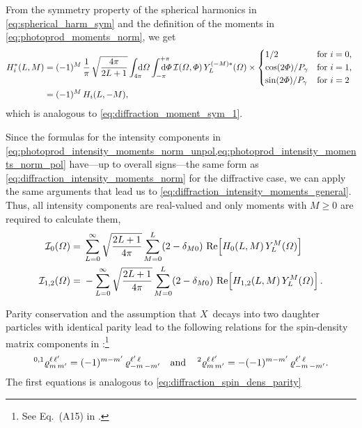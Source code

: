 From the symmetry property of the spherical harmonics in
\cref{eq:spherical_harm_sym} and the definition of the moments in
\cref{eq:photoprod_moments_norm}, we get
\begin{align}
  \label{eq:photoprod_moments_sym_1}
  H_i^*(L, M)
  ={}& (-1)^M\, \frac{1}{\pi}\, \sqrt{\frac{4 \pi}{2 L + 1}}
  \int_{4 \pi}\!\!\!\! \dif{\Omega} \int_{-\pi}^{+\pi}\hspace{-1.2em} \dif{\Phi}\,
  \intensity(\Omega, \Phi)\, Y_L^{(-M) *}(\Omega) \times \begin{cases*}
    1 / 2                   & for $i = 0$, \\
    \cos(2 \Phi) / P_\gamma & for $i = 1$, \\
    \sin(2 \Phi) / P_\gamma & for $i = 2$
  \end{cases*}
  \\
  ={}& (-1)^M\, H_i(L, {-M}),
\end{align}
which is analogous to \cref{eq:diffraction_moment_sym_1}.

Since the formulas for the intensity components in
\cref{eq:photoprod_intensity_moments_norm_unpol,eq:photoprod_intensity_moments_norm_pol}
have---up to overall signs---the same form as
\cref{eq:diffraction_intensity_moments_norm} for the diffractive case,
we can apply the same arguments that lead us to
\cref{eq:diffraction_intensity_moments_general}.  Thus, all intensity
components are real-valued and only moments with $M \geq 0$ are
required to calculate them, \ie
\begin{align}
  \label{eq:photoprod_intensity_moments_unpol_general}
  \intensity_0(\Omega)
  ={}& \sum_{L = 0}^\infty \sqrt{\frac{2 L + 1}{4 \pi}} \sum_{M = 0}^{L} (2 - \delta_{M 0})\, \Re{H_0(L, M)\, Y_L^M(\Omega)}
  \\
  \label{eq:photoprod_intensity_moments_pol_general}
  \intensity_{1, 2}(\Omega)
  ={}& -\sum_{L = 0}^\infty \sqrt{\frac{2 L + 1}{4 \pi}} \sum_{M = 0}^{L} (2 - \delta_{M 0})\, \Re{H_{1, 2}(L, M)\, Y_L^M(\Omega)}.
\end{align}

Parity conservation and the assumption that $X$~decays into two
daughter particles with identical parity lead to the following
relations for the spin-density matrix components in
:\footnote{See
Eq.~(A15) in .}
\begin{equation}
  \label{eq:photoprod_spin_dens_parity}
  \prescript{0, 1}{}{\varrho}^{\ell\, \ell'}_{m\, m'}
  = (-1)^{m - m'}\, \varrho^{\ell'\, \ell}_{{-m}\, {-m'}}
  \quad\text{and}\quad
  \prescript{2}{}{\varrho}^{\ell\, \ell'}_{m\, m'}
  = -(-1)^{m - m'}\, \varrho^{\ell'\, \ell}_{{-m}\, {-m'}}.
\end{equation}
The first equations is analogous to
\cref{eq:diffraction_spin_dens_parity}

